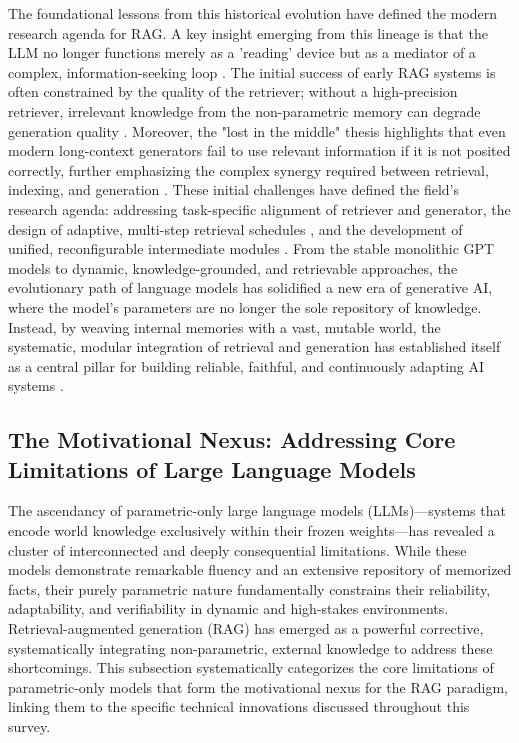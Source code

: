 \documentclass[11pt,a4paper]{article}
\begin{document}
The foundational lessons from this historical evolution have defined the modern research agenda for RAG. A key insight emerging from this lineage is that the LLM no longer functions merely as a 'reading' device but as a mediator of a complex, information-seeking loop \cite{arxiv:2305.06983v2}. The initial success of early RAG systems is often constrained by the quality of the retriever; without a high-precision retriever, irrelevant knowledge from the non-parametric memory can degrade generation quality \cite{arxiv:2404.17723v2,arxiv:2401.15884v2}. Moreover, the "lost in the middle" thesis highlights that even modern long-context generators fail to use relevant information if it is not posited correctly, further emphasizing the complex synergy required between retrieval, indexing, and generation \cite{arxiv:2307.03172v3}. These initial challenges have defined the field's research agenda: addressing task-specific alignment of retriever and generator, the design of adaptive, multi-step retrieval schedules \cite{arxiv:2305.06983v2,arxiv:2305.15294v2}, and the development of unified, reconfigurable intermediate modules \cite{arxiv:2407.21059v1}. From the stable monolithic GPT models to dynamic, knowledge-grounded, and retrievable approaches, the evolutionary path of language models has solidified a new era of generative AI, where the model's parameters are no longer the sole repository of knowledge. Instead, by weaving internal memories with a vast, mutable world, the systematic, modular integration of retrieval and generation has established itself as a central pillar for building reliable, faithful, and continuously adapting AI systems \cite{arxiv:2312.10997v5}.


\subsection{The Motivational Nexus: Addressing Core Limitations of Large Language Models}


The ascendancy of parametric-only large language models (LLMs)---systems that encode world knowledge exclusively within their frozen weights---has revealed a cluster of interconnected and deeply consequential limitations. While these models demonstrate remarkable fluency and an extensive repository of memorized facts, their purely parametric nature fundamentally constrains their reliability, adaptability, and verifiability in dynamic and high-stakes environments. Retrieval-augmented generation (RAG) has emerged as a powerful corrective, systematically integrating non-parametric, external knowledge to address these shortcomings. This subsection systematically categorizes the core limitations of parametric-only models that form the motivational nexus for the RAG paradigm, linking them to the specific technical innovations discussed throughout this survey.
\end{document}
